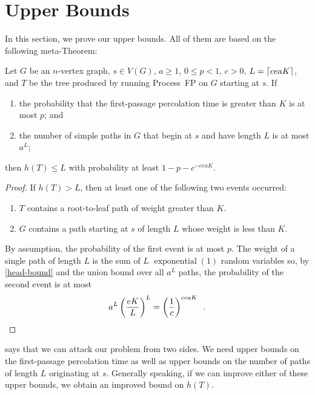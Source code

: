 \documentclass[lotsofwhite]{patmorin}
\DeclareMathOperator{\exponential}{exponential}
\begin{document}
\section{Upper Bounds}

In this section, we prove our upper bounds. All of them are based on
the following meta-Theorem:

\begin{lem}
   Let $G$ be an $n$-vertex graph, $s\in V(G)$, $a\ge 1$, $0\le p<1$, $c>0$, 
   $L={\lceil ceaK \rceil}$, and $T$ be the tree produced by running Process~FP
   on $G$ starting at $s$.  If 
   \begin{enumerate}
      \item the probability that the first-passage percolation time is greater than $K$ is at most $p$; and

      \item the number of simple paths in $G$ that begin at $s$ and have
        length $L$ is at most $a^L$;
   \end{enumerate}
   then $h(T) \le L$ with probability at least $1-p-c^{-ceaK}$.
\end{lem}

\begin{proof}
   If $h(T)> L$, then at least one of the following two events occurred:
   \begin{enumerate}
     \item $T$ contains a root-to-leaf path of weight greater than $K$.
     \item $G$ contains a path starting at $s$ of length $L$ whose weight 
        is less than $K$.
   \end{enumerate}
   By assumption, the probability of the first event is at most $p$.  
   The weight of a single path of length $L$ is the sum of $L$ $\exponential(1)$
   random variables so, by \eqref{head-bound} and the union bound over
   all $a^L$ paths, the probability of the second event is at most
   \[
       a^L \left(\frac{eK}{L} \right)^L = \left(\frac{1}{c}\right)^{ceaK}
       \enspace . \qedhere
   \]
\end{proof}

 says that we can attack our problem from two
sides. We need upper bounds on the first-passage percolation time as well
as upper bounds on the number of paths of length $L$ originating at $s$.
Generally speaking, if we can improve either of these upper bounds,
we obtain an improved bound on $h(T)$.
\end{document}
